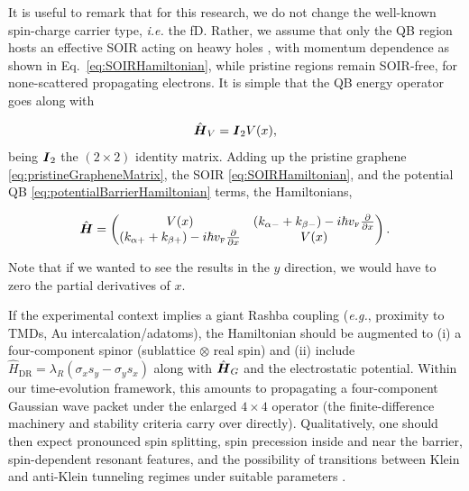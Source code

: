 

It is useful to remark that for this research, we do not change the well-known spin-charge carrier type,\textit{ i.e.} the fD. Rather, we assume that only the QB region hosts an effective SOIR acting on heawy holes \cite{Serna2019}, with momentum dependence as shown in Eq.~\eqref{eq:SOIRHamiltonian}, while pristine regions remain SOIR-free, for none-scattered propagating electrons. It is simple that the QB energy operator goes along with 

\begin{equation}
    \label{eq:potentialBarrierHamiltonian}
    \hat{\mbox{\boldmath $H$}}_V = \mbox{\boldmath $I$}_2 V(x),
\end{equation}
being $\mbox{\boldmath $I$}_2$ the $(2\times 2)$ identity matrix. Adding up the pristine graphene \eqref{eq:pristineGrapheneMatrix}, the SOIR \eqref{eq:SOIRHamiltonian}, and the potential QB \eqref{eq:potentialBarrierHamiltonian} terms, the Hamiltonians, 

\begin{equation}
    \label{eq:hybridHamiltonian}
    \hat{\mbox{\boldmath $H$}}=
    \begin{pmatrix}
        V(x) & \left(k_{\alpha-}+k_{\beta-}\right)-i\hbar v_{\mbox{\tiny F}}\frac{\partial}{\partial x} \\
        \left(k_{\alpha+}+k_{\beta+}\right)-i\hbar v_{\mbox{\tiny F}}\frac{\partial}{\partial x} & V(x)
    \end{pmatrix}.
\end{equation}

Note that if we wanted to see the results in the $y$ direction, we would have to zero the partial derivatives of $x$.

If the experimental context implies a giant Rashba coupling (\textit{e.g.}, proximity to TMDs, Au intercalation/adatoms), the Hamiltonian should be augmented to
(i) a four-component spinor (sublattice $\otimes$ real spin) and
(ii) include $\hat{H}_{\mathrm{DR}}=\lambda_R(\sigma_x s_y-\sigma_y s_x)$ along with $\hat{\mbox{\boldmath $H$}}_G$ and the electrostatic potential.
Within our time-evolution framework, this amounts to propagating a four-component Gaussian wave packet under the enlarged $4\times 4$ operator (the finite-difference machinery and stability criteria carry over directly).
Qualitatively, one should then expect pronounced spin splitting, spin precession inside and near the barrier, spin-dependent resonant features, and the possibility of transitions between Klein and anti-Klein tunneling regimes under suitable parameters \cite{DellAnnaJPhysCondMatt2018, WangPhysRevX2016}.

